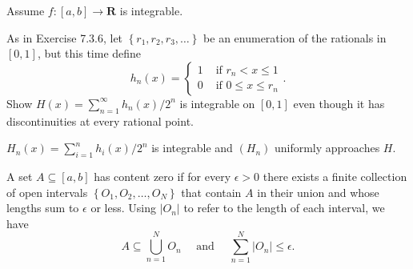 \begin{exercise} Assume $f:[a, b] \rightarrow \mathbf{R}$ is integrable.
\end{exercise}
\begin{solution}
    \TODO
\end{solution}

\begin{exercise} As in Exercise 7.3.6, let $\left\{r_{1}, r_{2}, r_{3}, \ldots\right\}$ be an enumeration of the rationals in $[0,1]$, but this time define
$$
h_{n}(x)=\left\{\begin{array}{ll}
1 & \text { if } r_{n}<x \leq 1 \\
0 & \text { if } 0 \leq x \leq r_{n}
\end{array} .\right.
$$
Show $H(x)=\sum_{n=1}^{\infty} h_{n}(x) / 2^{n}$ is integrable on $[0,1]$ even though it has discontinuities at every rational point.
\end{exercise}
\begin{solution}
\(H_n(x) = \sum^n_{i=1} h_i(x) / 2^n\) is integrable and \((H_n)\) uniformly approaches \(H\).
\end{solution}

\begin{exercise} A set $A \subseteq[a, b]$ has content zero if for every $\epsilon>0$ there exists a finite collection of open intervals $\left\{O_{1}, O_{2}, \ldots, O_{N}\right\}$ that contain $A$ in their union and whose lengths sum to $\epsilon$ or less. Using $\left|O_{n}\right|$ to refer to the length of each interval, we have
$$
A \subseteq \bigcup_{n=1}^{N} O_{n} \quad \text { and } \quad \sum_{n=1}^{N}\left|O_{n}\right| \leq \epsilon .
$$
\end{exercise}
\begin{solution}
    \TODO
\end{solution}
